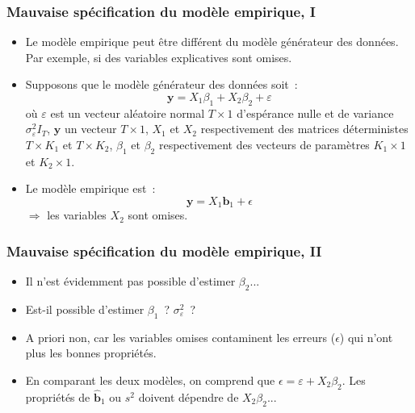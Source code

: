 \documentclass[10pt]{beamer}
\theoremstyle{plain}
\begin{document}
\begin{frame}
  \frametitle{Mauvaise spécification du modèle empirique, I}

  \begin{itemize}

  \item Le modèle empirique peut être différent du modèle générateur des données. Par exemple, si des variables explicatives sont omises.\newline

  \item Supposons que le modèle générateur des données soit~:
    \[
      \mathbf y = X_1\beta_1 + X_2\beta_2 + \varepsilon
    \]
    où $\varepsilon$ est un vecteur aléatoire normal $T\times 1$ d'espérance nulle et de variance $\sigma_{\varepsilon}^2I_T$, $\mathbf y$ un vecteur $T\times 1$, $X_1$ et $X_2$ respectivement des matrices déterministes $T\times K_1$ et $T\times K_2$, $\beta_1$ et $\beta_2$ respectivement des vecteurs de paramètres $K_1\times 1$ et $K_2\times 1$.\newline

  \item Le modèle empirique est~:
    \[
      \mathbf y = X_1\mathbf b_1 + \epsilon
    \]
    $\Rightarrow$ les variables $X_2$ sont omises.

  \end{itemize}

\end{frame}


\begin{frame}
  \frametitle{Mauvaise spécification du modèle empirique, II}

  \begin{itemize}

  \item Il n'est évidemment pas possible d'estimer $\beta_2$...\newline

  \item Est-il possible d'estimer $\beta_1$~? $\sigma_{\varepsilon}^2$~?\newline

  \item A priori non, car les variables omises contaminent les erreurs
    ($\epsilon$) qui n'ont plus les bonnes propriétés.\newline

  \item En comparant les deux modèles, on comprend
    que $\epsilon = \varepsilon + X_2\beta_2$. Les propriétés
    de $\hat{\mathbf b}_1$ ou $s^2$ doivent dépendre
    de $X_2\beta_2$...

  \end{itemize}

\end{frame}
\end{document}
